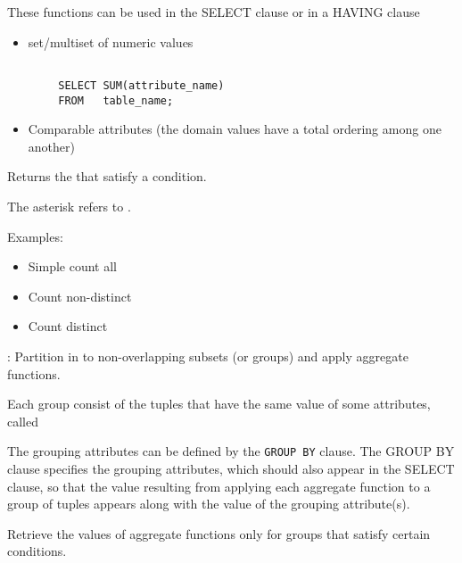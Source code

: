 \par These functions can be used in the SELECT clause or in a HAVING clause


      \begin{itemize}
        \item set/multiset of numeric values
      \end{itemize}

      \begin{verbatim}

        SELECT SUM(attribute_name)
        FROM   table_name;
      \end{verbatim}

      \begin{itemize}
        \item Comparable attributes (the domain values have a total ordering among one another)
      \end{itemize}

      \par Returns the  that satisfy a condition.
      \par The asterisk refers to .
      \par Examples:
        \begin{itemize}
          \item Simple count all
          \item Count non-distinct
          \item Count distinct
        \end{itemize}

  \par {}: Partition in to non-overlapping subsets (or groups) and apply aggregate functions.

    \par Each group consist of the tuples that have the same value of some attributes, called 

    \par The grouping attributes can be defined by the \lstinline{GROUP BY} clause. The GROUP BY clause specifies the grouping attributes, which should also appear in the SELECT clause, so that the value resulting from applying each aggregate function to a group of tuples appears along with the value of the grouping attribute(s).

    \par Retrieve the values of aggregate functions only for groups that satisfy certain conditions.
